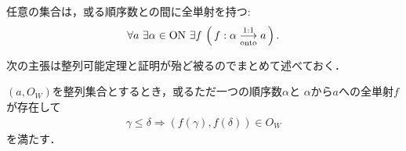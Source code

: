 	
	\begin{screen}
		\begin{thm}[整列可能定理]\label{thm:well_ordering_theorem}
			任意の集合は，或る順序数との間に全単射を持つ:
			\begin{align}
				\forall a\ \exists \alpha \in \ON\ 
				\exists f\, \left(\, f:\alpha \bij a\, \right).
			\end{align}
		\end{thm}
	\end{screen}
	
	次の主張は整列可能定理と証明が殆ど被るのでまとめて述べておく．
	\begin{screen}
		\begin{thm}[整列集合は唯一つの順序数に順序同型である]\label{thm:existence_of_order_type}
			$(a,O_W)$を整列集合とするとき，或るただ一つの順序数$\alpha$と
			$\alpha$から$a$への全単射$f$が存在して
			\begin{align}
				\gamma \leq \delta \Longrightarrow (f(\gamma),f(\delta)) \in O_W
			\end{align}
			を満たす．
		\end{thm}
	\end{screen}
	
